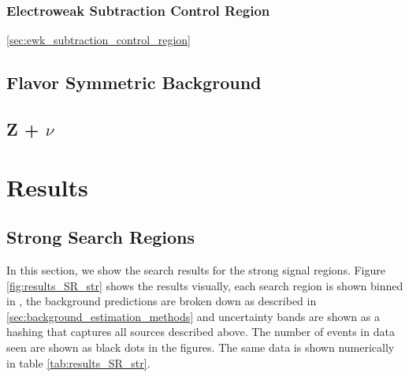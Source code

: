     \subsubsection{Electroweak Subtraction Control Region} \ref{sec:ewk_subtraction_control_region}

  \subsection{Flavor Symmetric Background} \label{sec:flavor_symmetric_background}

  \subsection{Z + $\nu$} \label{sec:z_+_neutrino}

\section{Results} \label{sec:results}
  \subsection{Strong Search Regions} \label{sec:strong_search_regions}
    In this section, we show the search results for the strong signal regions. Figure \ref{fig:results_SR_str} shows the results visually, each search region is shown binned in \MET, the background predictions are broken down as described in \ref{sec:background_estimation_methods} and uncertainty bands are shown as a hashing that captures all sources described above. The number of events in data seen are shown as black dots in the figures. The same data is shown numerically in table \ref{tab:results_SR_str}.


